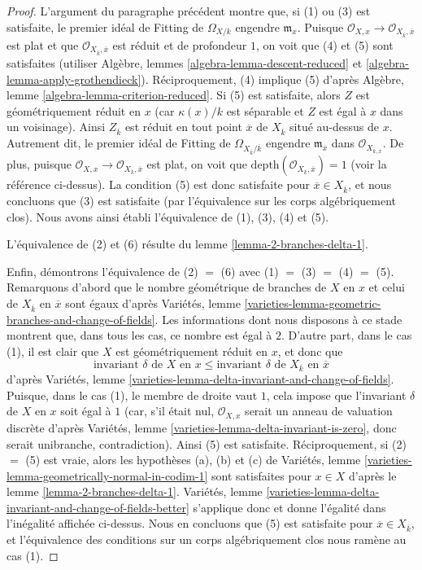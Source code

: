 \begin{proof}
\medskip\noindent
L'argument du paragraphe précédent montre que, si (1) ou (3) est satisfaite, le premier idéal de Fitting de $\Omega_{X/k}$ engendre $\mathfrak m_x$. Puisque $\mathcal{O}_{X, x} \to \mathcal{O}_{X_{\overline{k}}, \overline{x}}$ est plat et que $\mathcal{O}_{X_{\overline{k}}, \overline{x}}$ est réduit et de profondeur $1$, on voit que (4) et (5) sont satisfaites (utiliser Algèbre, lemmes \ref{algebra-lemma-descent-reduced} et \ref{algebra-lemma-apply-grothendieck}). Réciproquement, (4) implique (5) d'après Algèbre, lemme \ref{algebra-lemma-criterion-reduced}. Si (5) est satisfaite, alors $Z$ est géométriquement réduit en $x$ (car $\kappa(x)/k$ est séparable et $Z$ est égal à $x$ dans un voisinage). Ainsi $Z_{\overline{k}}$ est réduit en tout point $\overline{x}$ de $X_{\overline{k}}$ situé au-dessus de $x$. Autrement dit, le premier idéal de Fitting de $\Omega_{X_{\overline{k}}/\overline{k}}$ engendre $\mathfrak m_{\overline{x}}$ dans $\mathcal{O}_{X_{\overline{k}, \overline{x}}}$. De plus, puisque $\mathcal{O}_{X, x} \to \mathcal{O}_{X_{\overline{k}}, \overline{x}}$ est plat, on voit que $\text{depth}(\mathcal{O}_{X_{\overline{k}}, \overline{x}}) = 1$ (voir la référence ci-dessus). La condition (5) est donc satisfaite pour $\overline{x} \in X_{\overline{k}}$, et nous concluons que (3) est satisfaite (par l'équivalence sur les corps algébriquement clos). Nous avons ainsi établi l'équivalence de (1), (3), (4) et (5).

\medskip\noindent
L'équivalence de (2) et (6) résulte du lemme \ref{lemma-2-branches-delta-1}.

\medskip\noindent
Enfin, démontrons l'équivalence de (2) $=$ (6) avec (1) $=$ (3) $=$ (4) $=$ (5). Remarquons d'abord que le nombre géométrique de branches de $X$ en $x$ et celui de $X_{\overline{k}}$ en $\overline{x}$ sont égaux d'après Variétés, lemme \ref{varieties-lemma-geometric-branches-and-change-of-fields}. Les informations dont nous disposons à ce stade montrent que, dans tous les cas, ce nombre est égal à $2$. D'autre part, dans le cas (1), il est clair que $X$ est géométriquement réduit en $x$, et donc que $$
\text{invariant }\delta\text{ de }X\text{ en }x \leq
\text{invariant }\delta\text{ de }X_{\overline{k}}\text{ en }\overline{x}
$$ d'après Variétés, lemme \ref{varieties-lemma-delta-invariant-and-change-of-fields}. Puisque, dans le cas (1), le membre de droite vaut $1$, cela impose que l'invariant $\delta$ de $X$ en $x$ soit égal à $1$ (car, s'il était nul, $\mathcal{O}_{X, x}$ serait un anneau de valuation discrète d'après Variétés, lemme \ref{varieties-lemma-delta-invariant-is-zero}, donc serait unibranche, contradiction). Ainsi (5) est satisfaite. Réciproquement, si (2) $=$ (5) est vraie, alors les hypothèses (a), (b) et (c) de Variétés, lemme \ref{varieties-lemma-geometrically-normal-in-codim-1} sont satisfaites pour $x \in X$ d'après le lemme \ref{lemma-2-branches-delta-1}. Variétés, lemme \ref{varieties-lemma-delta-invariant-and-change-of-fields-better} s'applique donc et donne l'égalité dans l'inégalité affichée ci-dessus. Nous en concluons que (5) est satisfaite pour $\overline{x} \in X_{\overline{k}}$, et l'équivalence des conditions sur un corps algébriquement clos nous ramène au cas (1).
\end{proof}

